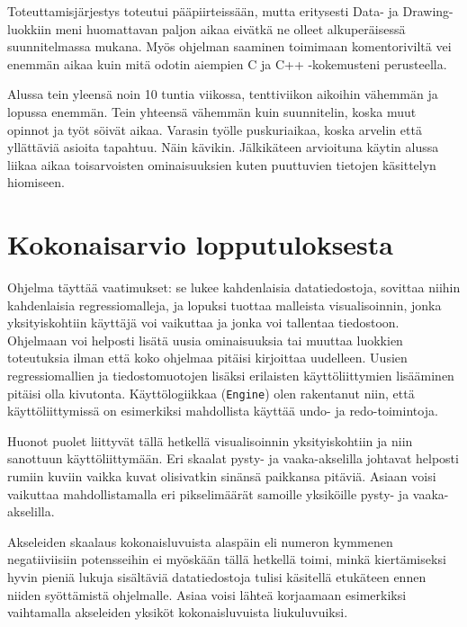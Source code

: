 \documentclass{article}
\begin{document}
        Toteuttamisjärjestys toteutui pääpiirteissään, mutta eritysesti Data- ja Drawing-luokkiin
        meni huomattavan paljon aikaa eivätkä ne olleet alkuperäisessä suunnitelmassa mukana.
        Myös ohjelman saaminen toimimaan komentoriviltä vei enemmän aikaa kuin mitä odotin
        aiempien C ja C++ -kokemusteni perusteella.

        Alussa tein yleensä noin 10 tuntia viikossa, tenttiviikon aikoihin vähemmän ja lopussa
        enemmän. Tein yhteensä vähemmän kuin suunnitelin, koska muut opinnot ja työt söivät aikaa.
        Varasin työlle puskuriaikaa, koska arvelin että yllättäviä asioita tapahtuu. Näin kävikin.
        Jälkikäteen arvioituna käytin alussa liikaa aikaa toisarvoisten ominaisuuksien kuten
        puuttuvien tietojen käsittelyn hiomiseen.
        
\section{Kokonaisarvio lopputuloksesta}    

        Ohjelma täyttää vaatimukset: se lukee kahdenlaisia datatiedostoja, sovittaa niihin
        kahdenlaisia regressiomalleja, ja lopuksi tuottaa malleista visualisoinnin, jonka
        yksityiskohtiin käyttäjä voi vaikuttaa ja jonka voi tallentaa tiedostoon. Ohjelmaan
        voi helposti lisätä uusia ominaisuuksia tai muuttaa luokkien toteutuksia ilman että
        koko ohjelmaa pitäisi kirjoittaa uudelleen. Uusien regressiomallien ja tiedostomuotojen
        lisäksi erilaisten käyttöliittymien lisääminen pitäisi olla kivutonta. Käyttölogiikkaa
        (\texttt{Engine}) olen rakentanut niin, että käyttöliittymissä on esimerkiksi
        mahdollista käyttää undo- ja redo-toimintoja.

        Huonot puolet liittyvät tällä hetkellä visualisoinnin yksityiskohtiin ja niin sanottuun
        käyttöliittymään. Eri skaalat pysty- ja vaaka-akselilla johtavat helposti rumiin
        kuviin vaikka kuvat olisivatkin sinänsä paikkansa pitäviä. Asiaan voisi vaikuttaa
        mahdollistamalla eri pikselimäärät samoille yksiköille pysty- ja vaaka-akselilla.

        Akseleiden skaalaus kokonaisluvuista alaspäin eli numeron kymmenen negatiiviisiin potensseihin
        ei myöskään tällä hetkellä toimi, minkä kiertämiseksi hyvin pieniä lukuja sisältäviä
        datatiedostoja tulisi käsitellä etukäteen ennen niiden syöttämistä ohjelmalle. Asiaa
        voisi lähteä korjaamaan esimerkiksi vaihtamalla akseleiden yksiköt kokonaisluvuista
        liukuluvuiksi.
\end{document}
